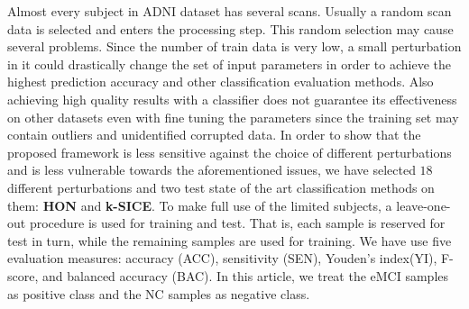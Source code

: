 \documentclass[journal]{IEEEtran}
\begin{document}
{	Almost every subject in ADNI dataset has several scans. Usually a random scan data is selected and enters the processing step. This random selection may cause several problems. Since the number of train data is very low, a small perturbation in it could drastically change the set of input parameters in order to achieve the highest prediction accuracy and other classification evaluation methods. Also achieving high quality results with a classifier does not guarantee its effectiveness on other datasets even with fine tuning the parameters since the training set may contain outliers and unidentified corrupted data. 
	In order to show that the proposed framework is less sensitive against the choice of different perturbations and is less vulnerable towards the aforementioned issues, we have selected $18$ different perturbations and two test state of the art classification methods on them: \textbf{HON} and \textbf{k-SICE}.   
	To make full use of the limited subjects, a leave-one-out procedure is used for training and test. That is, each sample is reserved for test in turn, while the remaining samples are used for training.
	We have use five
	evaluation measures: accuracy (ACC), sensitivity (SEN), Youden’s index(YI), F-score, and balanced accuracy (BAC). 
	In this article, we treat the eMCI samples as positive class and the NC samples as negative class.
	
}
\end{document}
